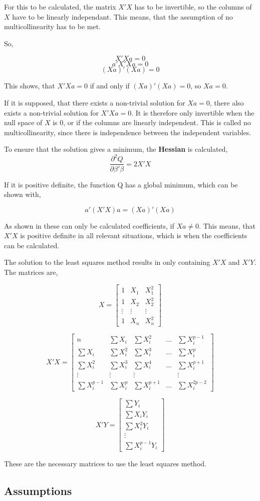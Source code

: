 	
	For this to be calculated, the matrix $X' X$ has to be invertible, so the columns of $X$ have to be linearly independant.
	This means, that the assumption of no multicollinearity has to be met.
	
	So, 
	
	$$X' Xa  =0$$
	$$ a' X' X a =0$$
	$$(Xa)'(Xa)=0$$
	
	This shows, that $X'Xa=0$ if and only if $(Xa)'(Xa)=0$, so $Xa=0$. 
	
	If it is supposed, that there exists a non-trivial solution for $Xa=0$, there also exists a non-trivial solution for $X'Xa=0$. It is therefore only invertible when the null space of $X$ is 0, or if the columns are linearly independent. This is called no multicollinearity, since there is independence between the independent variables. 
	
	To ensure that the solution gives a minimum, the \textbf{Hessian} is calculated,
	$$\frac{\partial^2 Q}{\partial \beta' \beta}=2X'X$$
	
	If it is positive definite, the function Q has a global minimum, which can be shown with,
	
	$$a' (X' X)a = (Xa)' (Xa)$$
	
	As shown in %
	these can only be calculated coefficients, if $Xa \not= 0$. This means, that $X'X$ is positive definite in all relevant situations, which is when the coefficients can be calculated. 
	
	The solution to the least squares method results in only containing $X'X$ and $X'Y$.
	The matrices are,
	
	
	
	$$X=
	\left[
	\begin{array}{ccc}
		1 &X_1	& X_1^2\\ 
		1 & X_2 & X_2^2	\\
		\vdots & \vdots & \vdots \\
		1 & X_n& X_n^2
	\end{array}
	\right]
	$$
	
	$$X'X=
	\left[
	\begin{array}{ccccc}
		n &\sum X_i	& \sum X_i^2 & ... &\sum X_i^{p-1}\\ 
		\sum X_i & \sum X_i^2 & \sum X_i^3&...& \sum X_i^p	\\
		\sum X_i^2 & \sum X_i^3 & \sum X_i^4 & ... & \sum X_i^{p+1}\\
		\vdots&\vdots&\vdots& & \vdots	\\
		\sum X_i^{p-1} &\sum X_i^p& \sum X_i^{p+1} & ... & \sum X_i^{2p-2}
	\end{array}
	\right]
	$$
	
	$$X' Y=
	\left[
	\begin{array}{c}
		\sum Y_i\\ 
		\sum X_i Y_i	\\
		\sum X_i^2 Y_i \\
		\vdots	\\
		\sum X_i^{p-1} Y_i
	\end{array}
	\right]
	$$
	
	These are the necessary matrices to use the least squares method.
	
	
	
	


	\subsection{Assumptions}
	